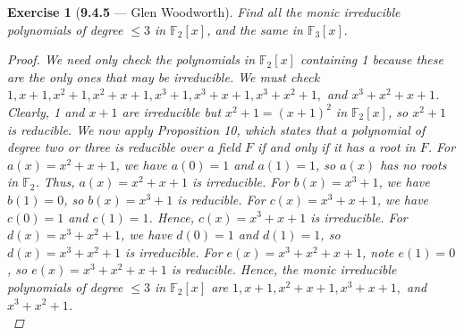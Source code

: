\documentclass[12pt]{amsart}
\newtheorem{exercise}[theorem]{Exercise}
\theoremstyle{remark}
\newcommand{\FF}{{\mathbb F}}
\theoremstyle{mycomment}
\begin{document}
\begin{exercise}[\textbf{9.4.5} --- Glen Woodworth] Find all the monic irreducible polynomials of degree $\le 3$ in $\FF_2[x]$, and the same in $\FF_3[x].$
  \begin{proof}
 We need only check the polynomials in $\FF_2[x]$ containing 1 because these are the only ones that may be irreducible. We must check $1, x+1,x^2+1,x^2+x+1,x^3+1,x^3+x+1,x^3+x^2+1,$ and $x^3+x^2+x+1$. Clearly, 1 and $x+1$ are irreducible but $x^2+1=(x+1)^2$ in $\FF_2[x]$, so $x^2+1$ is reducible. We now apply Proposition 10, which states that a polynomial of degree two or three is reducible over a field $F$ if and only if it has a root in $F$.  For $a(x)=x^2+x+1$, we have $a(0)=1$ and $a(1)=1$, so $a(x)$ has no roots in $\FF_2$. Thus, $a(x)=x^2+x+1$ is irreducible. For $b(x)=x^3+1$, we have $b(1)=0$, so $b(x)=x^3+1$ is reducible. For $c(x)=x^3+x+1$, we have $c(0)=1$ and $c(1)=1$. Hence, $c(x)=x^3+x+1$ is irreducible. For $d(x)=x^3+x^2+1$, we have $d(0)=1$ and $d(1)=1$, so $d(x)=x^3+x^2+1$ is irreducible. For $e(x)=x^3+x^2+x+1$, note $e(1)=0$, so $e(x)=x^3+x^2+x+1$ is reducible. Hence, the monic irreducible polynomials of degree $\le 3$ in $\FF_2[x]$ are $1,x+1,x^2+x+1,x^3+x+1,$ and $x^3+x^2+1$.\\

\end{proof}
\end{exercise}
\end{document}
